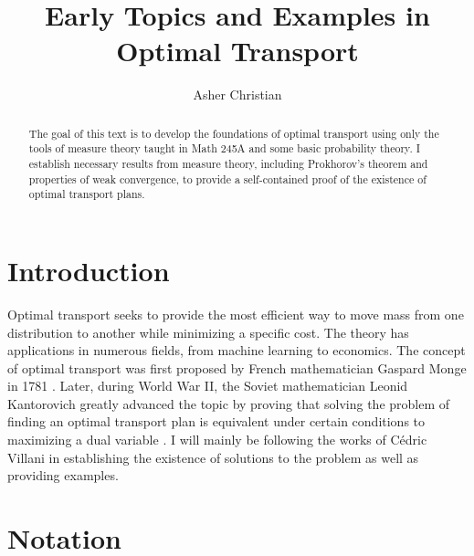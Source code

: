\documentclass[11pt]{amsart}
\title{Early Topics and Examples in Optimal Transport}
\author{Asher Christian}
\theoremstyle{definition}                  %
\theoremstyle{remark}                      %
\begin{document}
\maketitle

\begin{abstract}
    The goal of this text is to develop the foundations of optimal transport using only the tools
    of measure theory taught in Math 245A and some basic probability theory. 
    I establish necessary results from measure theory, including Prokhorov's theorem and properties of weak convergence, to provide
    a self-contained proof of the existence of optimal transport plans.
\end{abstract}

\section{Introduction}
Optimal transport seeks to provide the most efficient way to move mass from one distribution to another while minimizing a specific cost.
The theory has applications in numerous fields, from machine learning to economics.
The concept of optimal transport was first proposed by French mathematician Gaspard Monge in 1781 \citep{monge1781ot}. Later, during World War II,
the Soviet mathematician Leonid Kantorovich greatly advanced the topic by proving that solving the problem of finding an optimal transport plan is equivalent under certain conditions
to maximizing a dual variable \citep{kantorovich1942english}.
I will mainly be following the works of C\'edric Villani \citep{villani2008ot} in establishing the existence of solutions to the problem as well as providing examples.

\section{Notation}
\end{document}
